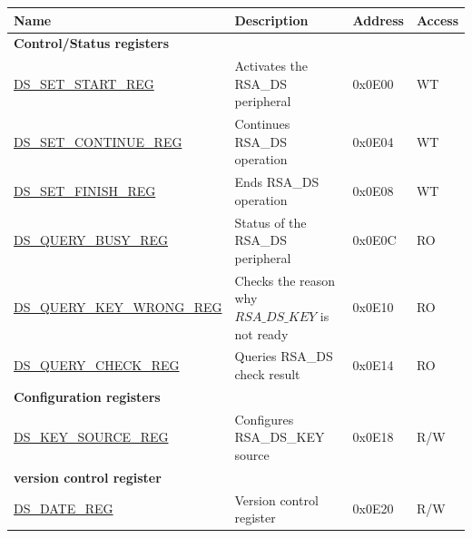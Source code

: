\begin{longtable}{ | p{6cm} | p{7.2cm} | p{1.3cm} | p{1cm} | }
\hline\rowcolor{lightgray}
\textbf{Name} & \textbf{Description} &  \textbf{Address} & \textbf{Access} \\ \hline
\endhead
\multicolumn{4}{|l|}{\textbf{Control/Status registers}} \\ \hline
\hyperref[regdesc:DSSETSTARTREG]{DS\_SET\_START\_REG} & Activates the RSA\_DS peripheral & 0x0E00 & WT \\ \hline
\hyperref[regdesc:DSSETCONTINUEREG]{DS\_SET\_CONTINUE\_REG} & Continues RSA\_DS operation & 0x0E04 & WT \\ \hline
\hyperref[regdesc:DSSETFINISHREG]{DS\_SET\_FINISH\_REG} & Ends RSA\_DS operation & 0x0E08 & WT \\ \hline
\hyperref[regdesc:DSQUERYBUSYREG]{DS\_QUERY\_BUSY\_REG} & Status of the RSA\_DS peripheral & 0x0E0C & RO \\ \hline
\hyperref[regdesc:DSQUERYKEYWRONGREG]{DS\_QUERY\_KEY\_WRONG\_REG} & Checks the reason why \begin{math}RSA\_DS\_KEY\end{math} is not ready & 0x0E10 & RO \\ \hline
\hyperref[regdesc:DSQUERYCHECKREG]{DS\_QUERY\_CHECK\_REG} & Queries RSA\_DS check result & 0x0E14 & RO \\ \hline
\multicolumn{4}{|l|}{\textbf{Configuration registers}} \\ \hline
\hyperref[regdesc:DSKEYSOURCEREG]{DS\_KEY\_SOURCE\_REG} & Configures RSA\_DS\_KEY source & 0x0E18 & R/W \\ \hline
\multicolumn{4}{|l|}{\textbf{version control register}} \\ \hline
\hyperref[regdesc:DSDATEREG]{DS\_DATE\_REG} & Version control register & 0x0E20 & R/W \\ \hline
\end{longtable}
